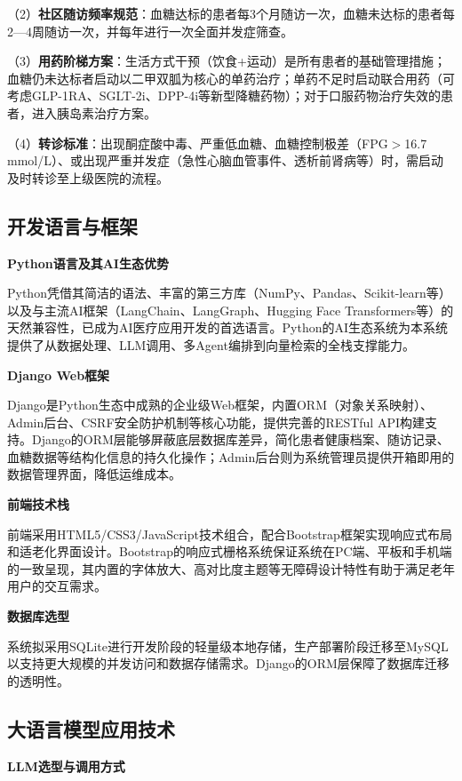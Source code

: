 （2）\textbf{社区随访频率规范}：血糖达标的患者每3个月随访一次，血糖未达标的患者每2---4周随访一次，并每年进行一次全面并发症筛查\todocite{}。

（3）\textbf{用药阶梯方案}：生活方式干预（饮食+运动）是所有患者的基础管理措施；血糖仍未达标者启动以二甲双胍为核心的单药治疗；单药不足时启动联合用药（可考虑GLP-1RA、SGLT-2i、DPP-4i等新型降糖药物）；对于口服药物治疗失效的患者，进入胰岛素治疗方案\todocite{}。

（4）\textbf{转诊标准}：出现酮症酸中毒、严重低血糖、血糖控制极差（FPG${>}$16.7 mmol/L）、或出现严重并发症（急性心脑血管事件、透析前肾病等）时，需启动及时转诊至上级医院的流程\todocite{}。

\subsection{开发语言与框架}

\noindent\textbf{Python语言及其AI生态优势}

Python凭借其简洁的语法、丰富的第三方库（NumPy、Pandas、Scikit-learn等）以及与主流AI框架（LangChain、LangGraph、Hugging Face Transformers等）的天然兼容性，已成为AI医疗应用开发的首选语言。Python的AI生态系统为本系统提供了从数据处理、LLM调用、多Agent编排到向量检索的全栈支撑能力。

\noindent\textbf{Django Web框架}

Django是Python生态中成熟的企业级Web框架，内置ORM（对象关系映射）、Admin后台、CSRF安全防护机制等核心功能，提供完善的RESTful API构建支持。Django的ORM层能够屏蔽底层数据库差异，简化患者健康档案、随访记录、血糖数据等结构化信息的持久化操作；Admin后台则为系统管理员提供开箱即用的数据管理界面，降低运维成本。

\noindent\textbf{前端技术栈}

前端采用HTML5/CSS3/JavaScript技术组合，配合Bootstrap框架实现响应式布局和适老化界面设计。Bootstrap的响应式栅格系统保证系统在PC端、平板和手机端的一致呈现，其内置的字体放大、高对比度主题等无障碍设计特性有助于满足老年用户的交互需求。

\noindent\textbf{数据库选型}

系统拟采用SQLite进行开发阶段的轻量级本地存储，生产部署阶段迁移至MySQL以支持更大规模的并发访问和数据存储需求。Django的ORM层保障了数据库迁移的透明性。

\subsection{大语言模型应用技术}

\noindent\textbf{LLM选型与调用方式}


